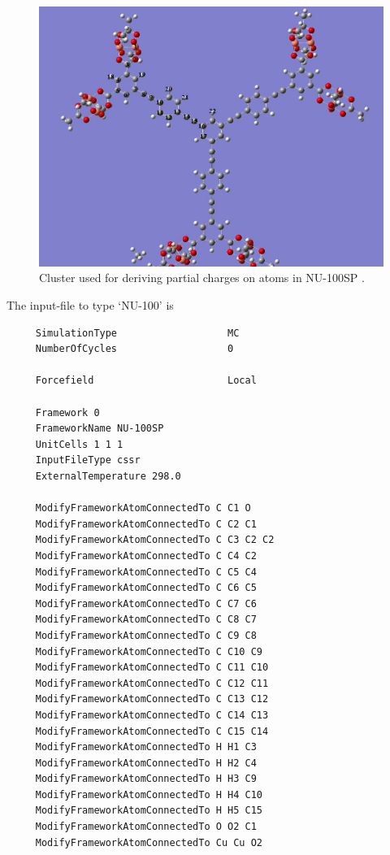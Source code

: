 \begin{figure}[t]
  \centering
   \includegraphics[width=15cm]{./InputFiles/NU-100.jpg}
  \caption{Cluster used for deriving partial charges on atoms in NU-100SP \cite{Farha2010}.}
  \label{Fig: NU-100 cluster}
\end{figure}


The input-file to type `NU-100' is
\begin{verbatim}
     SimulationType                   MC
     NumberOfCycles                   0
     
     Forcefield                       Local
     
     Framework 0
     FrameworkName NU-100SP
     UnitCells 1 1 1
     InputFileType cssr
     ExternalTemperature 298.0
     
     ModifyFrameworkAtomConnectedTo C C1 O
     ModifyFrameworkAtomConnectedTo C C2 C1
     ModifyFrameworkAtomConnectedTo C C3 C2 C2
     ModifyFrameworkAtomConnectedTo C C4 C2
     ModifyFrameworkAtomConnectedTo C C5 C4
     ModifyFrameworkAtomConnectedTo C C6 C5
     ModifyFrameworkAtomConnectedTo C C7 C6
     ModifyFrameworkAtomConnectedTo C C8 C7
     ModifyFrameworkAtomConnectedTo C C9 C8
     ModifyFrameworkAtomConnectedTo C C10 C9
     ModifyFrameworkAtomConnectedTo C C11 C10
     ModifyFrameworkAtomConnectedTo C C12 C11
     ModifyFrameworkAtomConnectedTo C C13 C12
     ModifyFrameworkAtomConnectedTo C C14 C13
     ModifyFrameworkAtomConnectedTo C C15 C14
     ModifyFrameworkAtomConnectedTo H H1 C3
     ModifyFrameworkAtomConnectedTo H H2 C4
     ModifyFrameworkAtomConnectedTo H H3 C9
     ModifyFrameworkAtomConnectedTo H H4 C10
     ModifyFrameworkAtomConnectedTo H H5 C15
     ModifyFrameworkAtomConnectedTo O O2 C1
     ModifyFrameworkAtomConnectedTo Cu Cu O2
\end{verbatim}

